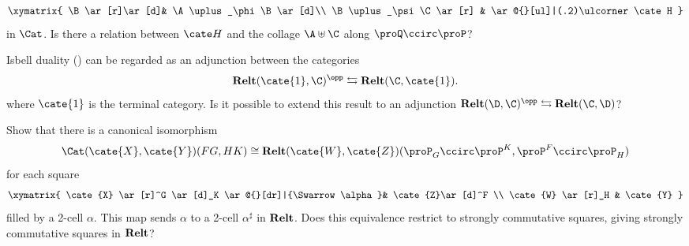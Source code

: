 \begin{exerciseset}
\begin{exercisepoints}
\[
\xymatrix{
\B \ar[r]\ar[d]& \A\uplus_\phi\B \ar[d]\\
\B\uplus_\psi\C \ar[r] & \ar@{}[ul]|(.2)\ulcorner \cate H
}
\]
in $\Cat$. Is there a relation between $\cate H$ and the collage $\A \uplus \C$ along $\proQ\ccirc \proP$?
\item Isbell duality () can be regarded as an adjunction between the categories
\[
\Dist(\cate{1}, \C)^\opp \leftrightarrows \Dist(\C, \cate{1}).
\]
where $\cate{1}$ is the terminal category. Is it possible to extend this result to an adjunction $\Dist(\D, \C)^\opp \leftrightarrows \Dist(\C, \D)$?
\item \label{forexactness} Show that there is a canonical isomorphism
\[
\Cat(\cate{X}, \cate{Y})(FG, HK) \cong \Dist(\cate{W}, \cate{Z})(\proP_G\ccirc \proP^K, \proP^F\ccirc \proP_H)
\]
for each square 
\[
\xymatrix{
	\cate{X} \ar[r]^G \ar[d]_K \ar@{}[dr]|{\Swarrow\alpha}& \cate{Z}\ar[d]^F \\
	\cate{W} \ar[r]_H & \cate{Y}
}
\]
filled by a 2-cell $\alpha$. This map sends $\alpha$ to a 2-cell $\alpha^\sharp$ in $\textbf{Relt}$. Does this equivalence restrict to strongly commutative squares, giving strongly commutative squares in $\textbf{Relt}$?
\end{exercisepoints}
\end{exerciseset}